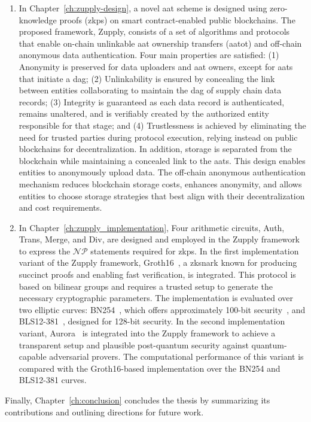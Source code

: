 \begin{enumerate}
\item  In Chapter~\ref{ch:zupply-design}, a novel \gls{aat} scheme is designed using zero-knowledge proofs (\glspl{zkp}) on smart contract-enabled public blockchains. The proposed framework, Zupply, consists of a set of algorithms and protocols that enable on-chain unlinkable \gls{aat} ownership transfers (\gls{aatot}) and off-chain anonymous data authentication. Four main properties are satisfied: (1) Anonymity is preserved for data uploaders and \gls{aat} owners, except for \glspl{aat} that initiate a \gls{dag}; (2) Unlinkability is ensured by concealing the link between entities collaborating to maintain the \gls{dag} of supply chain data records; (3) Integrity is guaranteed as each data record is authenticated, remains unaltered, and is verifiably created by the authorized entity responsible for that stage; and (4) Trustlessness is achieved by eliminating the need for trusted parties during protocol execution, relying instead on public blockchains for decentralization. In addition, storage is separated from the blockchain while maintaining a concealed link to the \glspl{aat}. This design enables entities to anonymously upload data. The off-chain anonymous authentication mechanism reduces blockchain storage costs, enhances anonymity, and allows entities to choose storage strategies that best align with their decentralization and cost requirements.

\item In Chapter~\ref{ch:zupply_implementation}, Four arithmetic circuits, \textsf{Auth}, \textsf{Trans}, \textsf{Merge}, and \textsf{Div}, are designed and employed in the Zupply framework to express the $\mathcal{NP}$ statements required for \glspl{zkp}. In the first implementation variant of the Zupply framework, Groth16~\cite{Groth2016}, a \gls{zksnark} known for producing succinct proofs and enabling fast verification, is integrated. This protocol is based on bilinear groups and requires a trusted setup to generate the necessary cryptographic parameters. The implementation is evaluated over two elliptic curves: BN254~\cite{BNcurve}, which offers approximately 100-bit security~\cite{Barbulescu2019}, and BLS12-381~\cite{BLS_curve2003}, designed for 128-bit security. In the second implementation variant, Aurora~\cite{Aurora2019} is integrated into the Zupply framework to achieve a transparent setup and plausible post-quantum security against quantum-capable adversarial provers. The computational performance of this variant is compared with the Groth16-based implementation over the BN254 and BLS12-381 curves.

\end{enumerate}
Finally, Chapter~\ref{ch:conclusion} concludes the thesis by summarizing its contributions and outlining directions for future work.

    